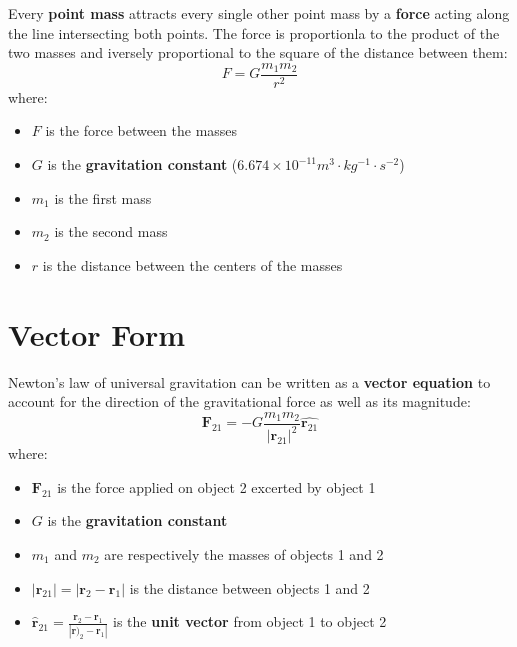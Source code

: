 Every \textbf{point mass} attracts every single other point mass by a \textbf{force} acting along the line intersecting both points. The force is proportionla to the product of the two masses and iversely proportional to the square of the distance between them:
\[
F = G\frac{m_1m_2}{r^2}
\]
where:
\begin{itemize}
	\item $F$ is the force between the masses
	\item $G$ is the \textbf{gravitation constant} ($6.674\times 10^{-11} m^3\cdot kg^{-1}\cdot s^{-2}$)
	\item $m_1$ is the first mass
	\item $m_2$ is the second mass
	\item $r$ is the distance between the centers of the masses
\end{itemize}

\section{Vector Form}
Newton's law of universal gravitation can be written as a \textbf{vector equation} to account for the direction of the gravitational force as well as its magnitude:
\[
\mathbf{F}_{21} = -G\frac{m_1m_2}{|\mathbf{r}_{21}|^2}\hat{\mathbf{r}_{21}}
\]
where:
\begin{itemize}
	\item $\mathbf{F}_{21}$ is the force applied on object 2 excerted by object 1
	\item $G$ is the \textbf{gravitation constant}
	\item $m_1$ and $m_2$ are respectively the masses of objects 1 and 2
	\item $|\mathbf{r}_{21}| = |\mathbf{r}_2 - \mathbf{r}_1|$ is the distance between objects 1 and 2
	\item $\hat{\mathbf{r}}_{21} = \frac{\mathbf{r}_2 - \mathbf{r}_1}{|\mathbf{r})_2 - \mathbf{r}_1|}$ is the \textbf{unit vector} from object 1 to object 2
\end{itemize}

